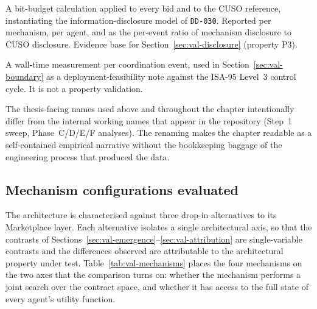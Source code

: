 \begin{description}[leftmargin=2.4em,style=nextline,itemsep=0.25em]
  \item[Disclosure quantification.] A bit-budget calculation applied
    to every bid and to the CUSO reference, instantiating the
    information-disclosure model of \texttt{DD-030}. Reported per
    mechanism, per agent, and as the per-event ratio of mechanism
    disclosure to CUSO disclosure. Evidence base for
    Section~\ref{sec:val-disclosure} (property P3).
  \item[Coordination-event latency.] A wall-time measurement per
    coordination event, used in Section~\ref{sec:val-boundary} as a
    deployment-feasibility note against the ISA-95 Level~3 control
    cycle. It is not a property validation.
\end{description}


The thesis-facing names used above and throughout the chapter
intentionally differ from the internal working names that appear in
the repository (Step~1 sweep, Phase~C/D/E/F analyses). The renaming
makes the chapter readable as a self-contained empirical narrative
without the bookkeeping baggage of the engineering process that
produced the data.

\subsection{Mechanism configurations evaluated}
\label{subsec:val-mechanisms}

The architecture is characterised against three drop-in alternatives
to its Marketplace layer. Each alternative isolates a single
architectural axis, so that the contrasts of
Sections~\ref{sec:val-emergence}--\ref{sec:val-attribution} are
single-variable contrasts and the differences observed are
attributable to the architectural property under test.
Table~\ref{tab:val-mechanisms} places the four mechanisms on the two
axes that the comparison turns on: whether the mechanism performs a
joint search over the contract space, and whether it has access to
the full state of every agent's utility function.

